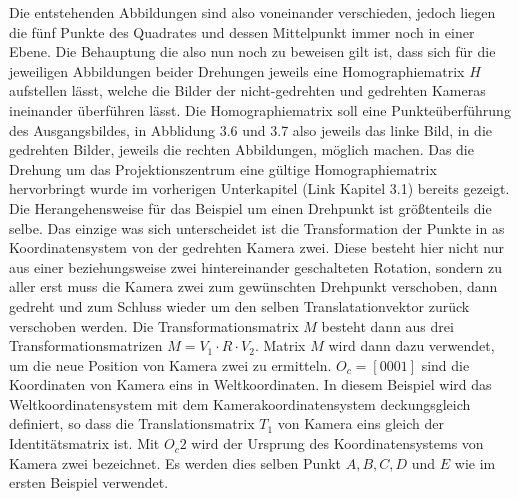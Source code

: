 Die entstehenden Abbildungen sind also voneinander verschieden, jedoch liegen die fünf Punkte des Quadrates und dessen Mittelpunkt immer noch in einer Ebene. Die Behauptung die also nun noch zu beweisen gilt ist, dass sich für die jeweiligen Abbildungen beider Drehungen jeweils eine Homographiematrix $H$ aufstellen lässt, welche die Bilder der nicht-gedrehten und gedrehten Kameras ineinander überführen lässt. Die Homographiematrix soll eine Punkteüberführung des Ausgangsbildes, in Abblidung 3.6 und 3.7 also jeweils das linke Bild, in die gedrehten Bilder, jeweils die rechten Abbildungen, möglich machen. Das die Drehung um das Projektionszentrum eine gültige Homographiematrix hervorbringt wurde im vorherigen Unterkapitel (Link Kapitel 3.1) bereits gezeigt. Die Herangehensweise für das Beispiel um einen Drehpunkt ist größtenteils die selbe. Das einzige was sich unterscheidet ist die Transformation der Punkte in as Koordinatensystem von der gedrehten Kamera zwei. Diese besteht hier nicht nur aus einer beziehungsweise zwei hintereinander geschalteten Rotation, sondern zu aller erst muss die Kamera zwei zum gewünschten Drehpunkt verschoben, dann gedreht und zum Schluss wieder um den selben Translatationvektor zurück verschoben werden. Die Transformationsmatrix $M$ besteht dann aus drei Transformationsmatrizen \ensuremath{M = V_1 \cdot R \cdot V_2}. Matrix $M$ wird dann dazu verwendet, um die neue Position von Kamera zwei zu ermitteln. $O_c = [0 0 0 1]$ sind die Koordinaten von Kamera eins in Weltkoordinaten. In diesem Beispiel wird das Weltkoordinatensystem mit dem Kamerakoordinatensystem deckungsgleich definiert, so dass die Translationsmatrix $T_1$ von Kamera eins gleich der Identitätsmatrix ist. Mit $O_c2$ wird der Ursprung des Koordinatensystems von Kamera zwei bezeichnet. Es werden dies selben Punkt $A,B,C,D$ und $E$ wie im ersten Beispiel verwendet.\\


